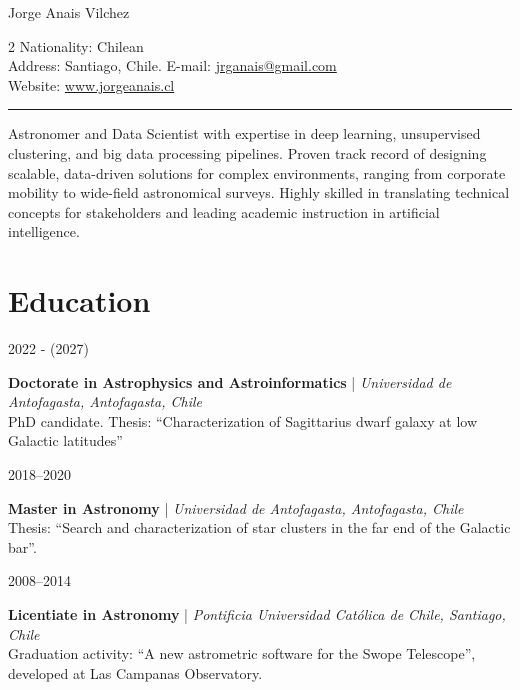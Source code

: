 \documentclass[10pt, a4paper]{article}
\newlength{\datebox}
\newlength{\textbox}
\newcommand{\eduitem}[4]{\noindent\parbox[t]{\datebox}{#1}%
    \parbox[t]{\textbox}{\textbf{\textcolor{ViridianGreen}{#2}} | \textit{#3}\\
    \textcolor{Jet}{\small #4}}\par\vspace{0.35cm}}
\begin{document}
{\LARGE \textcolor{DarkCornflowerBlue}{Jorge Anais Vilchez}} \\

\begin{minipage}{\linewidth}
\begin{multicols}{2}
Nationality: Chilean\\
Address: Santiago, Chile.
\vfill\eject
E-mail: \href{mailto:jrganais@gmail.com}{jrganais@gmail.com}\\
Website: \url{www.jorgeanais.cl}\\
\end{multicols}
\end{minipage}

\hrule

\vspace{0.3cm}
\begin{flushright}
  \begin{minipage}{15 cm}
  \textcolor{Jet}{\small Astronomer and Data Scientist with expertise in deep learning, unsupervised clustering, and big data processing pipelines. Proven track record of designing scalable, data-driven solutions for complex environments, ranging from corporate mobility to wide-field astronomical surveys. Highly skilled in translating technical concepts for stakeholders and leading academic instruction in artificial intelligence.}
  \end{minipage}
\end{flushright}

\section*{Education}
\eduitem{2022 - (2027)}{Doctorate in Astrophysics and Astroinformatics}{Universidad de Antofagasta, Antofagasta, Chile}{PhD candidate. Thesis: \enquote{Characterization of Sagittarius dwarf galaxy at low Galactic latitudes}}
\eduitem{2018--2020}{Master in Astronomy}{Universidad de Antofagasta, Antofagasta, Chile}{Thesis: \enquote{Search and characterization of star clusters in the far end of the Galactic bar}.}
\eduitem{2008--2014}{Licentiate in Astronomy}{Pontificia Universidad Católica de Chile, Santiago, Chile}{Graduation activity: \enquote{A new astrometric software for the Swope Telescope}, developed at Las Campanas Observatory.}
\end{document}
